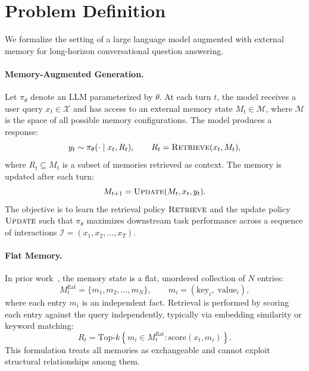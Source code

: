 \section{Problem Definition}

We formalize the setting of a large language model augmented with external memory for long-horizon conversational question answering.

\paragraph{Memory-Augmented Generation.}
Let $\pi_\theta$ denote an LLM parameterized by $\theta$. At each turn $t$, the model receives a user query $x_t \in \mathcal{X}$ and has access to an external memory state $M_t \in \mathcal{M}$, where $\mathcal{M}$ is the space of all possible memory configurations. The model produces a response:
\begin{equation}
y_t \sim \pi_\theta(\cdot \mid x_t, R_t), \qquad R_t = \textsc{Retrieve}(x_t, M_t),
\end{equation}
where $R_t \subseteq M_t$ is a subset of memories retrieved as context. The memory is updated after each turn:
\begin{equation}
M_{t+1} = \textsc{Update}(M_t, x_t, y_t).
\end{equation}
The objective is to learn the retrieval policy $\textsc{Retrieve}$ and the update policy $\textsc{Update}$ such that $\pi_\theta$ maximizes downstream task performance across a sequence of interactions $\mathcal{I} = (x_1, x_2, \ldots, x_T)$.

\paragraph{Flat Memory.}
In prior work~, the memory state is a flat, unordered collection of $N$ entries:
\begin{equation}
M_t^{\text{flat}} = \{m_1, m_2, \ldots, m_N\}, \qquad m_i = (\text{key}_i,\; \text{value}_i),
\end{equation}
where each entry $m_i$ is an independent fact. Retrieval is performed by scoring each entry against the query independently, typically via embedding similarity or keyword matching:
\begin{equation}
R_t = \text{Top-}k \left\{ m_i \in M_t^{\text{flat}} : \text{score}(x_t, m_i) \right\}.
\end{equation}
This formulation treats all memories as exchangeable and cannot exploit structural relationships among them.

